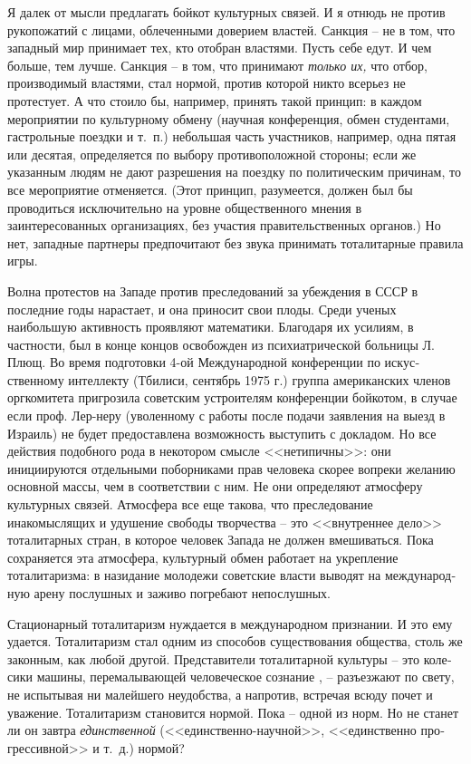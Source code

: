 \documentclass{book}
\begin{document}
Я далек от мысли предлагать бойкот культурных связей. И я отнюдь не против рукопожатий с лицами, облеченными доверием властей. Санкция -- не в том, что западный мир прини­мает тех, кто отобран властями. Пусть себе едут. И чем боль­ше, тем лучше. Санкция -- в том, что принимают \textit{только их,} что отбор, производимый властями, стал нормой, против кото­рой никто всерьез не протестует. А что стоило бы, например, принять такой принцип: в каждом мероприятии по культур­ному обмену (научная конференция, обмен студентами, га­строльные поездки и т.~п.) небольшая часть участников, напри­мер, одна пятая или десятая, определяется по выбору проти­воположной стороны; если же указанным людям не дают раз­решения на поездку по политическим причинам, то все меро­приятие отменяется. (Этот принцип, разумеется, должен был бы проводиться исключительно на уровне общественного мне­ния в заинтересованных организациях, без участия правитель­ственных органов.) Но нет, западные партнеры предпочитают без звука принимать тоталитарные правила 
игры.

Волна протестов на Западе против преследований за убеж­дения в СССР в последние годы нарастает, и она приносит свои плоды. Среди ученых наибольшую активность проявляют мате­матики. Благодаря их усилиям, в частности, был в конце кон­цов освобожден из психиатрической больницы Л. Плющ. Во время подготовки 4-ой Международной конференции по искус­ственному интеллекту (Тбилиси, сентябрь 1975 г.) группа американских членов оргкомитета пригрозила советским уст­роителям конференции бойкотом, в случае если проф. Лер-неру (уволенному с работы после подачи заявления на выезд в Израиль) не будет предоставлена возможность выступить с докладом. Но все действия подобного рода в некотором смыс­ле <<нетипичны>>: они инициируются отдельными поборниками прав человека скорее вопреки желанию основной массы, чем в соответствии с ним. Не они определяют атмосферу культур­ных связей. Атмосфера все еще такова, что преследование инакомыслящих и удушение свободы творчества -- это <<внут­реннее дело>> тоталитарных стран, в которое 
человек 
Запада не должен вмешиваться. Пока сохраняется эта атмосфера, культурный обмен работает на укрепление тоталитаризма: в назидание молодежи советские власти выводят на международ­ную арену послушных и заживо погребают непослушных.

Стационарный тоталитаризм нуждается в международном признании. И это ему удается. Тоталитаризм стал одним из спо­собов существования общества, столь же законным, как лю­бой другой. Представители тоталитарной культуры -- это коле­сики машины, перемалывающей человеческое сознание , -- разъез­жают по свету, не испытывая ни малейшего неудобства, а на­против, встречая всюду почет и уважение. Тоталитаризм стано­вится нормой. Пока -- одной из норм. Но не станет ли он завт­ра \textit{единственной}  (<<единственно-научной>>, <<единственно про­грессивной>> и т.~д.) нормой?
\end{document}
